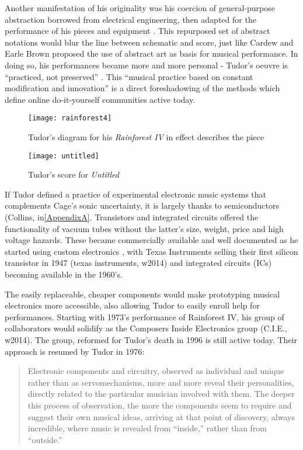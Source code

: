 \begin{itemize}
Another manifestation of his originality was his coercion of general-purpose abstraction borrowed from electrical engineering, then adapted for the performance of his pieces and equipment \cite{kuivila2004}. This repurposed set of abstract notations would blur the line between schematic and score, just like Cardew and Earle Brown proposed the use of abstract art as basis for musical performance. In doing so, his performances became more and more personal - Tudor’s oeuvre is “practiced, not preserved” \cite{kuivila1998}. This “musical practice based on constant modification and innovation” \cite{driscoll2004} is a direct foreshadowing of the methods which define online do-it-yourself communities active today. 

	\begin{figure}[h!]
	  \caption{Tudor's diagram for his \emph{Rainforest IV} in effect describes the piece}
	  \centering
	    \texttt{[image: rainforest4]}
	\end{figure}

	\begin{figure}[h!]
	  \caption{Tudor's score for \emph{Untitled}}
	  \centering
	    \texttt{[image: untitled]}
	\end{figure}

If Tudor defined a practice of experimental electronic music systems that complements Cage’s sonic uncertainty, it is largely thanks to semiconductors (Collins, in\ref{AppendixA}. Transistors and integrated circuits offered the functionality of vacuum tubes without the latter’s size, weight, price and high voltage hazards. These became commercially available and well documented as he started using custom electronics \cite{collins2004}, with Texas Instruments selling their first silicon transistor in 1947 (texas instruments, w2014) and integrated circuits (ICs) becoming available in the 1960’s.  

The easily replaceable, cheaper components would make prototyping musical electronics more accessible, also allowing Tudor to easily enroll help for performances. Starting with 1973’s performance of Rainforest IV, his group of collaborators would solidify as the Composers Inside Electronics group (C.I.E., w2014). The group, reformed for Tudor’s death in 1996 is still active today. Their approach is resumed by Tudor in 1976: 

\begin{quote}
						
Electronic components and circuitry, observed as individual and unique rather than as servomechanisms, more and more reveal their personalities, directly related to the particular musician involved with them. The deeper this process of observation, the more the components seem to require and suggest their own musical ideas, arriving at that point of discovery, always incredible, where music is revealed from ``inside,'' rather than from ``outside.'' \citep{tudor1976,nakai2014}


\end{quote}
\end{itemize}
